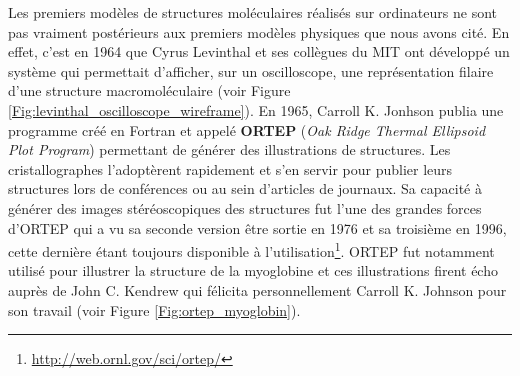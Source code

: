 
Les premiers modèles de structures moléculaires réalisés sur ordinateurs ne sont pas vraiment postérieurs aux premiers modèles physiques que nous avons cité. En effet, c'est en 1964 que Cyrus Levinthal et ses collègues du MIT ont développé un système qui permettait d'afficher, sur un oscilloscope, une représentation filaire d'une structure macromoléculaire (voir Figure \ref{Fig:levinthal_oscilloscope_wireframe}).
En 1965, Carroll K. Jonhson publia une programme créé en Fortran et appelé \textbf{ORTEP} (\textit{Oak Ridge Thermal Ellipsoid Plot Program}) permettant de générer des illustrations de structures. Les cristallographes l'adoptèrent rapidement et s'en servir pour publier leurs structures lors de conférences ou au sein d'articles de journaux. Sa capacité à générer des images stéréoscopiques des structures fut l'une des grandes forces d'ORTEP qui a vu sa seconde version être sortie en 1976 et sa troisième en 1996, cette dernière étant toujours disponible à l'utilisation\footnote{\url{http://web.ornl.gov/sci/ortep/}}. ORTEP fut notamment utilisé pour illustrer la structure de la myoglobine et ces illustrations firent écho auprès de John C. Kendrew qui félicita personnellement Carroll K. Johnson pour son travail (voir Figure \ref{Fig:ortep_myoglobin}).

